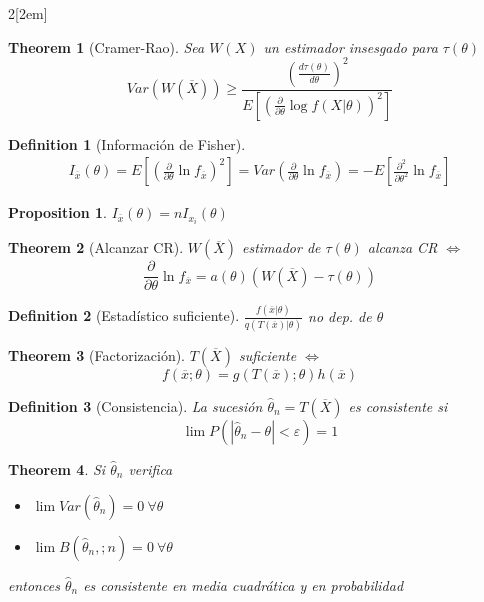 \documentclass[leqno]{article}
\newtheorem*{theorem}{Theorem}
\newtheorem*{proposition}{Proposition}
\newtheorem*{definition}{Definition}
\begin{document}
\begin{multicols}{2}[\columnsep2em]
\begin{theorem}[Cramer-Rao] Sea $W(X)$ un estimador insesgado para $\tau (\theta )$
  \[
	Var(W(\overline{X}))\ge \frac{\left(\frac{d \tau (\theta )}{d \theta } \right)^2}{E\left[ \left( \frac{\partial}{\partial\theta } \log f(X|\theta ) \right)^2 \right]}
  \] 
\end{theorem}

\begin{definition}[Información de Fisher]
  \begin{align*}
  I_{\overline{x}}(\theta ) = E\left[ \left(  \frac{\partial}{\partial \theta } \ln f_{\overline{x}} \right) ^2 \right]  = Var\left(\frac{\partial}{\partial \theta }\ln f_{\overline{x}}\right) =  -E\left[  \frac{\partial^2}{\partial \theta ^2} \ln f_{\overline{x}} \right]
  \end{align*}
\end{definition}

\begin{proposition} $I_{\overline{x}}(\theta ) = nI_{x_i}(\theta )$
\end{proposition}

\begin{theorem}[Alcanzar CR] $W(\overline{X})$ estimador de $\tau (\theta )$ alcanza CR  $\iff$
\[
\frac{\partial}{\partial \theta } \ln f_{\overline{x}} = a(\theta )(W(\overline{X})-\tau (\theta ))
\] 
\end{theorem}

\begin{definition}[Estadístico suficiente] $\frac{f(\overline{x}|\theta )}{q(T(\overline{x})|\theta )}$ no dep. de $\theta $
\end{definition}

\begin{theorem}[Factorización] $T(\overline{X})$ suficiente $\iff$ 
\[
f(\overline{x}; \theta ) = g(T(\overline{x});\theta )h(\overline{x})
\] 
\end{theorem}

\begin{definition}[Consistencia] La sucesión $\hat{\theta}_n = T(\overline{X})$ es consistente si 
\[
\lim P(|\hat{\theta }_n-\theta |<\varepsilon ) = 1
\] 
\end{definition}

\begin{theorem} Si $\hat{\theta }_n$ verifica
  \begin{itemize}[topsep=-6pt, itemsep=0pt]
    \item $\lim Var(\hat{\theta }_n) = 0 \ \forall \theta$
	\item $\lim B(\hat{\theta }_n,;n) = 0 \ \forall \theta $
  \end{itemize}
entonces $\hat{\theta}_n$ es consistente en media cuadrática y en probabilidad
\end{theorem}


\end{multicols}
\end{document}
